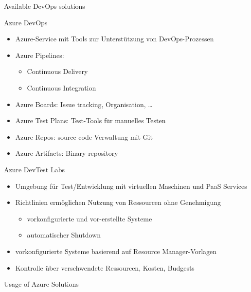 \begin{flashcard}[Describe]{Available DevOps solutions}

\end{flashcard}

\begin{flashcard}[Describe]{Azure DevOps}
    \begin{itemize}
        \item Azure-Service mit Tools zur Unterstützung von DevOps-Prozessen
        \item Azure Pipelines:
        \begin{itemize}
            \item Continuous Delivery
            \item Continuous Integration
        \end{itemize}
        \item Azure Boards: Issue tracking, Organisation, \ldots
        \item Azure Test Plans: Test-Tools für manuelles Testen
        \item Azure Repos: source code Verwaltung mit Git
        \item Azure Artifacts: Binary repository
    \end{itemize}

\end{flashcard}

\begin{flashcard}[Describe]{Azure DevTest Labs}
    \begin{itemize}
        \item Umgebung für Test/Entwicklung mit virtuellen Maschinen und PaaS Services
        \item Richtlinien ermöglichen Nutzung von Ressourcen ohne Genehmigung
        \begin{itemize}
            \item vorkonfigurierte und vor-erstellte Systeme
            \item automatischer Shutdown
        \end{itemize}
        \item vorkonfigurierte Systeme basierend auf Resource Manager-Vorlagen
        \item Kontrolle über verschwendete Ressourcen, Kosten, Budgests
    \end{itemize}
\end{flashcard}

\begin{flashcard}{Usage of Azure Solutions}

\end{flashcard}
